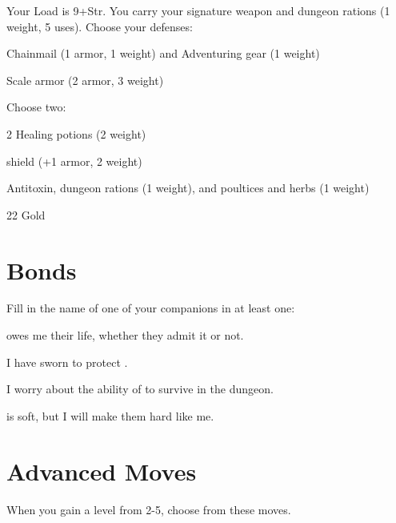 Your Load is 9+Str. You carry your signature weapon and dungeon rations (1 weight, 5 uses). Choose your defenses:

 
\startitemize[1,packed]

\item Chainmail (1 armor, 1 weight) and Adventuring gear (1 weight)

 
\item Scale armor (2 armor, 3 weight)


\stopitemize
 

Choose two:

 
\startitemize[1,packed]

\item 2 Healing potions (2 weight)

 
\item shield (+1 armor, 2 weight)

 
\item Antitoxin, dungeon rations (1 weight), and poultices and herbs (1 weight)

 
\item 22 Gold


\stopitemize


 
\section{Bonds}   
 



Fill in the name of one of your companions in at least one:

 

\thinrules[2] owes me their life, whether they admit it or not.

 

I have sworn to protect \thinrules[2].

 

I worry about the ability of \thinrules[2] to survive in the dungeon.

 

\thinrules[2] is soft, but I will make them hard like me.



 
\section{Advanced Moves}    
 


\startInstructionsAfterHeader
When you gain a level from 2-5, choose from these moves.
\stopInstructionsAfterHeader
 
